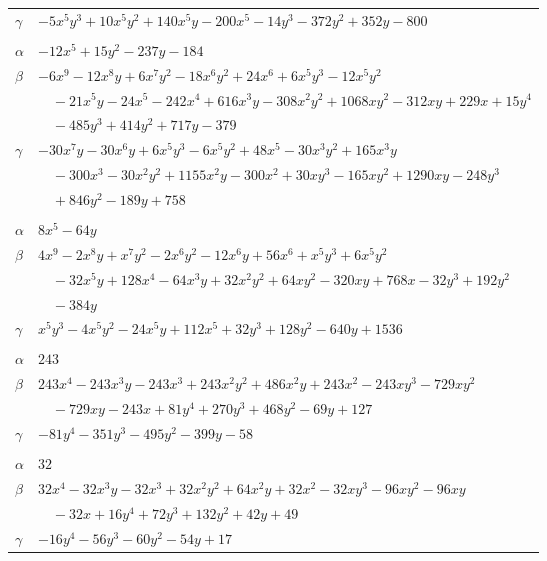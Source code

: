 \documentclass[11pt]{article}
\begin{document}
\begin{longtable}{@{}ll@{}}
$\gamma$ & $-5x^{5}y^{3}+10x^{5}y^{2}+140x^{5}y-200x^{5}-14y^{3}-372y^{2}+352y-800$\\
\addlinespace[3pt]
\multicolumn{2}{@{}l}{$\{i,j\}=\{7,25\}$, $k_{ij}=2\cdot 11$}\\
$\alpha$ & $-12x^{5}+15y^{2}-237y-184$\\
$\beta$ & $-6x^{9}-12x^{8}y+6x^{7}y^{2}-18x^{6}y^{2}+24x^{6}+6x^{5}y^{3}-12x^{5}y^{2}$\\
 & $\quad -21x^{5}y-24x^{5}-242x^{4}+616x^{3}y-308x^{2}y^{2}+1068xy^{2}-312xy+229x+15y^{4}$\\
 & $\quad -485y^{3}+414y^{2}+717y-379$\\
$\gamma$ & $-30x^{7}y-30x^{6}y+6x^{5}y^{3}-6x^{5}y^{2}+48x^{5}-30x^{3}y^{2}+165x^{3}y$\\
 & $\quad -300x^{3}-30x^{2}y^{2}+1155x^{2}y-300x^{2}+30xy^{3}-165xy^{2}+1290xy-248y^{3}$\\
 & $\quad +846y^{2}-189y+758$\\
\addlinespace[3pt]
\multicolumn{2}{@{}l}{$\{i,j\}=\{7,27\}$, $k_{ij}=2^{10}\cdot 3$}\\
$\alpha$ & $8x^{5}-64y$\\
$\beta$ & $4x^{9}-2x^{8}y+x^{7}y^{2}-2x^{6}y^{2}-12x^{6}y+56x^{6}+x^{5}y^{3}+6x^{5}y^{2}$\\
 & $\quad -32x^{5}y+128x^{4}-64x^{3}y+32x^{2}y^{2}+64xy^{2}-320xy+768x-32y^{3}+192y^{2}$\\
 & $\quad -384y$\\
$\gamma$ & $x^{5}y^{3}-4x^{5}y^{2}-24x^{5}y+112x^{5}+32y^{3}+128y^{2}-640y+1536$\\
\addlinespace[3pt]
\multicolumn{2}{@{}l}{$\{i,j\}=\{8,12\}$, $k_{ij}=5\cdot 13^{2}$}\\
$\alpha$ & $243$\\
$\beta$ & $243x^{4}-243x^{3}y-243x^{3}+243x^{2}y^{2}+486x^{2}y+243x^{2}-243xy^{3}-729xy^{2}$\\
 & $\quad -729xy-243x+81y^{4}+270y^{3}+468y^{2}-69y+127$\\
$\gamma$ & $-81y^{4}-351y^{3}-495y^{2}-399y-58$\\
\addlinespace[3pt]
\multicolumn{2}{@{}l}{$\{i,j\}=\{8,16\}$, $k_{ij}=3^{2}\cdot 5$}\\
$\alpha$ & $32$\\
$\beta$ & $32x^{4}-32x^{3}y-32x^{3}+32x^{2}y^{2}+64x^{2}y+32x^{2}-32xy^{3}-96xy^{2}-96xy$\\
 & $\quad -32x+16y^{4}+72y^{3}+132y^{2}+42y+49$\\
$\gamma$ & $-16y^{4}-56y^{3}-60y^{2}-54y+17$\\

\end{longtable}
\end{document}
